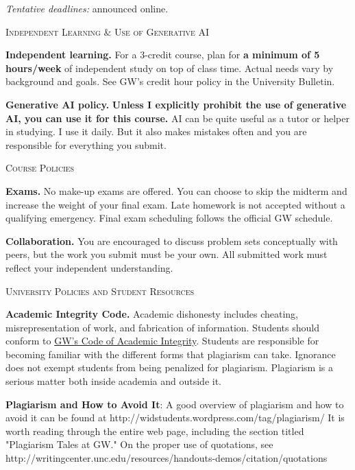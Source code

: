 \documentclass[11pt]{article}
\begin{document}
\smallskip
\textit{Tentative deadlines:} announced online.

\bigskip

\noindent\textsc{Independent Learning \& Use of Generative AI}

\smallskip
\textbf{Independent learning.} For a 3-credit course, plan for \textbf{a minimum of 5 hours/week} of independent study on top of class time. Actual needs vary by background and goals. See GW’s credit hour policy in the University Bulletin.

\smallskip
\textbf{Generative AI policy.} \textbf{Unless I explicitly prohibit the use of generative AI, you can use it for this course.} AI can be quite useful as a tutor or helper in studying. I use it daily. But it also makes mistakes often and you are responsible for everything you submit.  

\bigskip

\noindent\textsc{Course Policies}

\smallskip
\textbf{Exams.} No make-up exams are offered. You can choose to skip the midterm and increase the weight of your final exam. Late homework is not accepted without a qualifying emergency. Final exam scheduling follows the official GW schedule.

\smallskip
\textbf{Collaboration.} You are encouraged to discuss problem sets conceptually with peers, but the work you submit must be your own. All submitted work must reflect your independent understanding.

\bigskip

\noindent\textsc{University Policies and Student Resources}

\smallskip
\textbf{Academic Integrity Code.} Academic dishonesty includes cheating, misrepresentation of work, and fabrication of information. Students should conform to \href{https://students.gwu.edu/code-academic-integrity}{GW’s Code of Academic Integrity}. Students are responsible for becoming familiar with the different forms that plagiarism can take.  Ignorance does not exempt students from being penalized for plagiarism.  Plagiarism is a serious matter both inside academia and outside it.

\smallskip
\textbf{Plagiarism and How to Avoid It}: A good overview of plagiarism and how to avoid it can be found at http://widstudents.wordpress.com/tag/plagiarism/  It is worth reading through the entire web page, including the section titled "Plagiarism Tales at GW."   On the proper use of quotations, see http://writingcenter.unc.edu/resources/handouts-demos/citation/quotations
\end{document}
